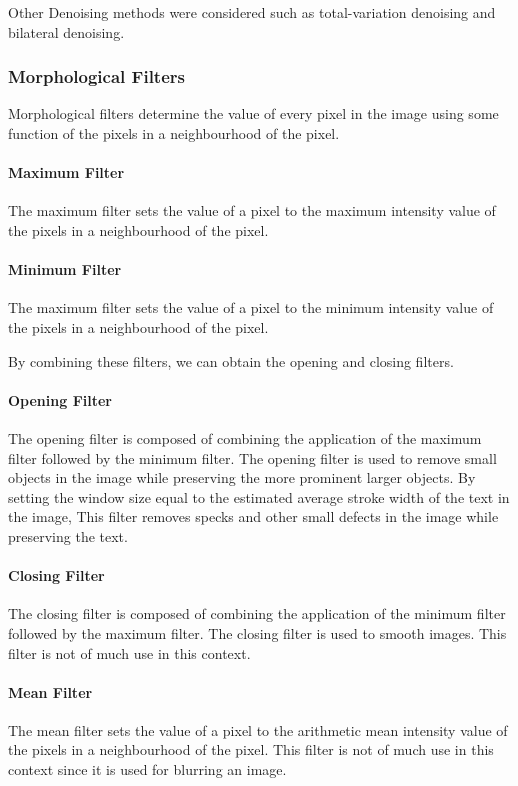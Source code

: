 \documentclass[a4paper, 12pt]{report}
\begin{document}
Other Denoising methods were considered such as total-variation denoising and
bilateral denoising.

\subsubsection{Morphological Filters}
Morphological filters determine the value of every pixel in the image using
some function of the pixels in a neighbourhood of the pixel.

\paragraph{Maximum Filter}
The maximum filter sets the value of a pixel to the maximum intensity value of
the pixels in a neighbourhood of the pixel.

\paragraph{Minimum Filter}
The maximum filter sets the value of a pixel to the minimum intensity value of
the pixels in a neighbourhood of the pixel.\par

By combining these filters, we can obtain the opening and closing filters.

\paragraph{Opening Filter}
The opening filter is composed of combining the application of the maximum
filter followed by the minimum filter. The opening filter is used to remove
small objects in the image while preserving the more prominent larger objects.
By setting the window size equal to the estimated average stroke width of the
text in the image, This filter removes specks and other small defects in the
image while preserving the text.

\paragraph{Closing Filter}
The closing filter is composed of combining the application of the minimum
filter followed by the maximum filter. The closing filter is used to smooth
images. This filter is not of much use in this context.

\paragraph{Mean Filter}
The mean filter sets the value of a pixel to the arithmetic mean intensity
value of the pixels in a neighbourhood of the pixel. This filter is not of much
use in this context since it is used for blurring an image.
\end{document}
